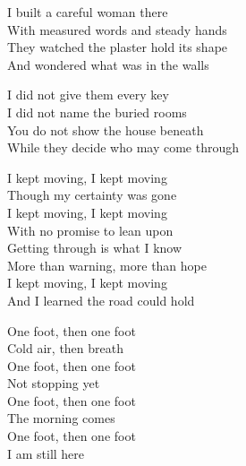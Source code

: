 \begin{lyrics}
I built a careful woman there\\
With measured words and steady hands\\
They watched the plaster hold its shape\\
And wondered what was in the walls

I did not give them every key\\
I did not name the buried rooms\\
You do not show the house beneath\\
While they decide who may come through

I kept moving, I kept moving\\
Though my certainty was gone\\
I kept moving, I kept moving\\
With no promise to lean upon\\
Getting through is what I know\\
More than warning, more than hope\\
I kept moving, I kept moving\\
And I learned the road could hold

One foot, then one foot\\
Cold air, then breath\\
One foot, then one foot\\
Not stopping yet\\
One foot, then one foot\\
The morning comes\\
One foot, then one foot\\
I am still here
\end{lyrics}

